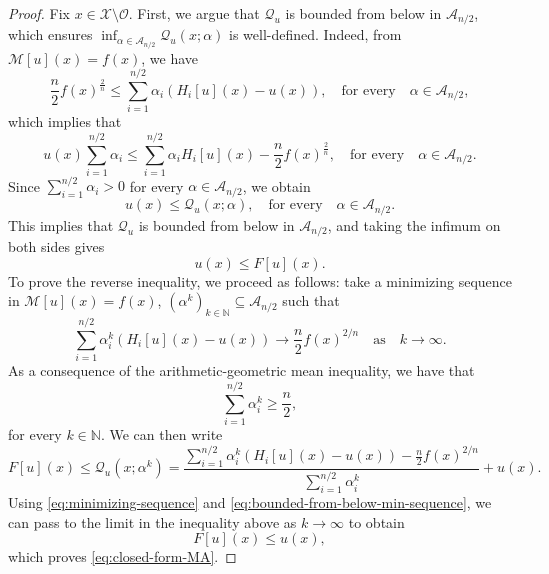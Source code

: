 \documentclass[reqno,11pt]{amsart}
\numberwithin{equation}{section}
\theoremstyle{definition}
\theoremstyle{remark}
\begin{document}
\begin{proof}
Fix $x \in \mathcal{X} \setminus \mathcal{O}$. First, we argue that $\mathcal{Q}_u$ is bounded from below in $\mathcal{A}_{n/2}$, which ensures $\inf_{\alpha \in \mathcal{A}_{n/2}} \mathcal{Q}_u(x;\alpha)$ is well-defined. Indeed, from \(\mathcal{M}[u](x) = f(x)\), we have
\[
    \frac{n}{2}f(x)^{\frac{2}{n}} \leq \sum_{i=1}^{n/2}\alpha_i \left(H_i[u](x)-u(x)\right), \quad \text{for every} \quad \alpha \in \mathcal{A}_{n/2}, 
\]
which implies that
\[
    u(x) \sum_{i=1}^{n/2}\alpha_i \leq \sum_{i=1}^{n/2}\alpha_i H_i[u](x) - \frac{n}{2}f(x)^{\frac{2}{n}}, \quad \text{for every} \quad \alpha \in \mathcal{A}_{n/2}.
\]
Since $\sum_{i=1}^{n/2}\alpha_i > 0$ for every $\alpha \in \mathcal{A}_{n/2}$, we obtain
\[
    u(x) \leq \mathcal{Q}_u(x;\alpha), \quad \text{for every} \quad \alpha \in \mathcal{A}_{n/2}.
\]
This implies that $\mathcal{Q}_u$ is bounded from below in $\mathcal{A}_{n/2}$, and taking the infimum on both sides gives 
\begin{equation}\label{eq:closed-form-MA.99}
    u(x) \leq F[u](x).
\end{equation}
To prove the reverse inequality, we proceed as follows: take a minimizing sequence in \(\mathcal{M}[u](x) = f(x)\), $(\alpha^k)_{k \in \mathbb{N}} \subseteq \mathcal{A}_{n/2}$ such that
\begin{equation}\label{eq:minimizing-sequence}
    \sum_{i=1}^{n/2}\alpha^k_i \left(H_i[u](x)-u(x)\right) \to \frac{n}{2}f(x)^{2/n} \quad \text{as} \quad k \to \infty.
\end{equation}
As a consequence of the arithmetic-geometric mean inequality, we have that
\begin{equation}\label{eq:bounded-from-below-min-sequence}
    \sum_{i=1}^{n/2} \alpha_i^k \geq \frac{n}{2},
\end{equation}
for every $k \in \mathbb{N}$. We can then write
\[
    F[u](x) \leq \mathcal{Q}_u(x;\alpha^k) = \frac{\sum_{i=1}^{n/2}\alpha^k_i \left(H_i[u](x) - u(x) \right) - \frac{n}{2}f(x)^{2/n}}{\sum_{i=1}^{n/2} \alpha_i^k} + u(x).
\]
Using \eqref{eq:minimizing-sequence} and \eqref{eq:bounded-from-below-min-sequence}, we can pass to the limit in the inequality above as $k \to \infty$ to obtain
\[
    F[u](x) \leq u(x),
\]
which proves \eqref{eq:closed-form-MA}.


\end{proof}
\end{document}
